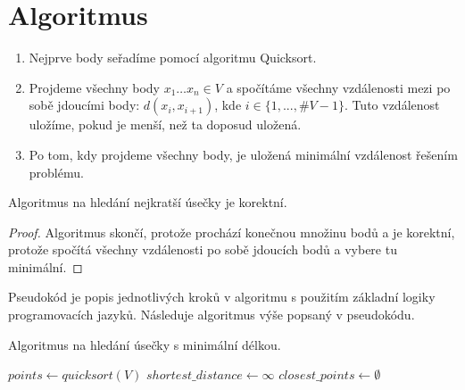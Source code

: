 \section{Algoritmus}
\label{sec:algoritmus_1D}
\begin{enumerate}
    \item Nejprve body seřadíme pomocí algoritmu Quicksort.
    \item Projdeme všechny body $x_1\ldots x_n \in V$ a spočítáme všechny vzdálenosti mezi po sobě jdoucími body: $d(x_i, x_{i+1})$, kde $i \in \{1,...,\#V-1\}$. Tuto vzdálenost uložíme, pokud je menší, než ta doposud uložená.
    \item Po tom, kdy projdeme všechny body, je uložená minimální vzdálenost řešením problému.
\end{enumerate}
\begin{tvrzeni}
    Algoritmus na hledání nejkratší úsečky je korektní.
\end{tvrzeni}
\begin{proof}
    Algoritmus skončí, protože prochází konečnou množinu bodů a je korektní, protože spočítá všechny vzdálenosti po sobě jdoucích bodů a vybere tu minimální.
\end{proof}


\begin{poznamka}
    Pseudokód je popis jednotlivých kroků v algoritmu s použitím základní logiky programovacích jazyků. Následuje algoritmus výše popsaný v pseudokódu.
\end{poznamka}

\begin{algorithm}[H]
    \caption{Algoritmus na hledání úsečky s minimální délkou.}
    \label{alg:algoritmus_1D}


    \BlankLine
    $points \leftarrow quicksort(V) $\;
    $shortest\_distance \leftarrow \infty$ \;
    $ closest\_points \leftarrow \emptyset $ \;
\end{algorithm}